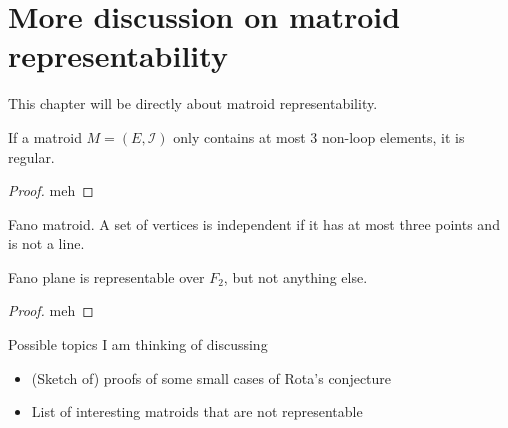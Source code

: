 \section{More discussion on matroid representability}
This chapter will be directly about matroid representability.

\begin{thm}
If a matroid $M = (E, \mathcal{I})$ only contains at most 3 non-loop elements, it is regular.
\end{thm}

\begin{proof}
meh
\end{proof}


\begin{defn}
Fano matroid.  A set of vertices is independent if it has at most three points and is not a line.
\end{defn}


\begin{thm}
Fano plane is representable over $F_2$, but not anything else.
\end{thm}

\begin{proof}
meh
\end{proof}


Possible topics I am thinking of discussing


\begin{itemize}
\item (Sketch of) proofs of some small cases of Rota's conjecture
\item List of interesting matroids that are not representable
\end{itemize}

